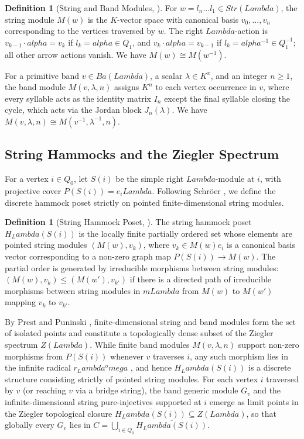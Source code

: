 \documentclass[11pt,a4paper,reqno]{amsart}
\def\mathbb#1{#1}%
\def\operatorname#1{#1}%
\def\K{K}%
\def\Zg{Z}%
\def\rad{r}%
\def\md{m}%
\def\times{x}%
\def\subset{\subseteq}%
\def\alpha{alpha}%
\def\omega{omega}%
\def\Lambda{Lambda}%
\def\emph#1{#1}%
\theoremstyle{definition}
\newtheorem{definition}[theorem]{Definition}
\theoremstyle{remark}
\newcommand{\K}{\mathbb{K}}
\newcommand{\rad}{\operatorname{rad}}
\newcommand{\md}[1]{\operatorname{mod}(#1)}
\newcommand{\Zg}{\operatorname{Zg}}
\begin{document}
\begin{definition}[String and Band Modules, \cite{ButlerRingel1987}]
\label{def:string_band_modules}
For $w = l_n \dots l_1 \in \operatorname{Str}(\Lambda)$, the \emph{string module} $M(w)$ is the $\K$-vector space with canonical basis $v_0, \dots, v_n$ corresponding to the vertices traversed by $w$. The right $\Lambda$-action is $v_{k-1} \cdot \alpha = v_k$ if $l_k = \alpha \in Q_1$, and $v_k \cdot \alpha = v_{k-1}$ if $l_k = \alpha^{-1} \in Q_1^{-1}$; all other arrow actions vanish. We have $M(w) \cong M(w^{-1})$.

For a primitive band $v \in \operatorname{Ba}(\Lambda)$, a scalar $\lambda \in \K^\times$, and an integer $n \ge 1$, the \emph{band module} $M(v, \lambda, n)$ assigns $\K^n$ to each vertex occurrence in $v$, where every syllable acts as the identity matrix $I_n$ except the final syllable closing the cycle, which acts via the Jordan block $J_n(\lambda)$. We have $M(v, \lambda, n) \cong M(v^{-1}, \lambda^{-1}, n)$.
\end{definition}

\subsection{String Hammocks and the Ziegler Spectrum}
\label{subsec:string_hammocks}

For a vertex $i \in Q_0$, let $S(i)$ be the simple right $\Lambda$-module at $i$, with projective cover $P(S(i)) = e_i\Lambda$. Following Schr\"oer \cite{Schroer1999}, we define the discrete hammock poset strictly on pointed finite-dimensional string modules.

\begin{definition}[String Hammock Poset, \cite{Schroer1999}]
\label{def:hammock_poset}
The \emph{string hammock poset} $H_\Lambda(S(i))$ is the locally finite partially ordered set whose elements are pointed string modules $(M(w), v_k)$, where $v_k \in M(w)e_i$ is a canonical basis vector corresponding to a non-zero graph map $P(S(i)) \to M(w)$. The partial order is generated by irreducible morphisms between string modules: $(M(w), v_k) \le (M(w'), v_{k'})$ if there is a directed path of irreducible morphisms between string modules in $\md{\Lambda}$ from $M(w)$ to $M(w')$ mapping $v_k$ to $v_{k'}$.
\end{definition}

By Prest and Puninski \cite{PrestPuninski2002}, finite-dimensional string and band modules form the set of isolated points and constitute a topologically dense subset of the Ziegler spectrum $\Zg(\Lambda)$. While finite band modules $M(v, \lambda, n)$ support non-zero morphisms from $P(S(i))$ whenever $v$ traverses $i$, any such morphism lies in the infinite radical $\rad_\Lambda^\omega$ \cite{Schroer2000a}, and hence $H_\Lambda(S(i))$ is a discrete structure consisting strictly of pointed string modules. For each vertex $i$ traversed by $v$ (or reaching $v$ via a bridge string), the band generic module $G_v$ and the infinite-dimensional string pure-injectives supported at $i$ emerge as limit points in the Ziegler topological closure $\overline{H_\Lambda(S(i))} \subset \Zg(\Lambda)$, so that globally every $G_v$ lies in $C = \bigcup_{i \in Q_0} \overline{H_\Lambda(S(i))}$.
\end{document}

